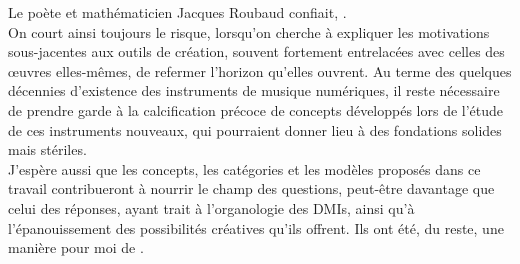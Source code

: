 







\noindent Le poète et mathématicien Jacques Roubaud confiait, .\\
\indent On court ainsi toujours le risque, lorsqu'on cherche à expliquer les motivations sous-jacentes aux outils de création, souvent fortement entrelacées avec celles des œuvres elles-mêmes, de refermer l'horizon qu'elles ouvrent. Au terme des quelques décennies d'existence des instruments de musique numériques, il reste nécessaire de  prendre garde à la calcification précoce de concepts développés lors de l'étude de ces instruments nouveaux, qui pourraient donner lieu à des fondations solides mais stériles.\\
\indent J'espère aussi que les concepts, les catégories et les modèles proposés dans ce travail contribueront à nourrir le champ des questions, peut-être davantage que celui des réponses, ayant trait à l'organologie des \glspl{DMI}, ainsi qu'à l'épanouissement des possibilités créatives qu'ils offrent. Ils ont été, du reste, une manière pour moi de .



